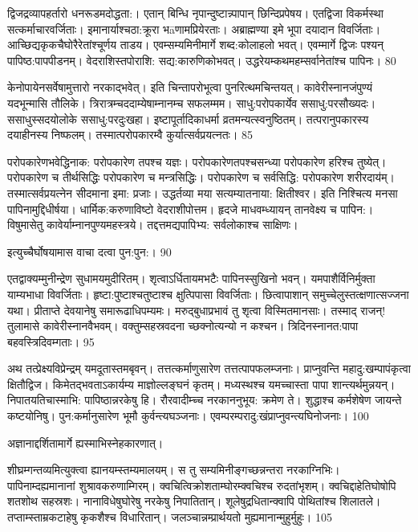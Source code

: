 द्विजद्रव्यापहर्तारो धनरूडमदोद्धता:।
एतान् बिन्धि नृपान्दुष्टान्न्पापान् छिन्दिप्रपेषय।
एतद्विजा विकर्मस्था सत्कर्माचारवर्जिताः।
इमानार्याश्चठा:क्रूरा भāणामप्रियेरताः।
अब्राह्मण्या इमे भूपा दयादान विवर्जिताः।
आच्छिद्यकृकचैघोरैरेतांश्चूर्णय ताडय।
एवम्सम्यमिनीमार्गे शब्द:कोलाहलो भवत्।
एवम्मार्गे द्विजः पश्यन् पापिष्ठ:पापपीडनम्।
वेदराशिस्तपोराशि: सद्य:कारुणिकोभवत्।
उद्धरेयम्कथमहम्सर्वानेतांश्च पापिनः।
80



केनोपायेनसर्वेषामुत्तारो नरकाद्भवेत्।
इति चिन्तापरोभूत्वा पुनरित्थमचिन्तयत्।
कावेरीस्नानजंपुण्यं यदभून्मासि तौलिके।
त्रिरात्रम्चददाम्येषाम्नानम्च सफलम्मम।
साधु:परोपकार्येव ससाधु:परसौख्यदः।
ससाधुस्सदयोलोके ससाधु:परदुःखहा।
इष्टापूर्तादिकाधर्मा व्रतमन्यत्स्वनुष्ठितम्।
तत्परानुपकारस्य दयाहीनस्य निष्फलम्।
तस्मात्परोपकारम्वै कुर्यात्सर्वप्रयत्नतः।
85

परोपकारेणभवेद्धिनाक: परोपकारेण तपश्च यज्ञः।
परोपकारेणतपश्चसन्ध्या परोपकारेण हरिश्च तुष्येत्।
परोपकारेण च तीर्थसिद्धिः
परोपकारेण च मन्त्रसिद्धिः।
परोपकारेण च सर्वसिद्धि:
परोपकारेण शरीरदाय॑म्।
तस्मात्सर्वप्रयत्नेन सीदमाना इमा: प्रजाः।
उद्धर्तव्या मया सत्यम्यातनाया: क्षितीश्वर।
इति निश्चित्य मनसा पापिनामुद्दिधीर्षया।
धार्मिक:करुणाविष्टो वेदराशीपोत्तम।
हृदजे माधवम्ध्यायन् तानवेक्ष्य च पापिन:।
विषुमासेतु कावेर्याम्नानपुण्यमहस्त्रये।
तद्दत्तमद्यपापिभ्य: सर्वलोकाश्च साक्षिणः।


इत्युच्चैर्घोषयामास वाचा दत्वा पुन:पुन:।
90

एतद्वाक्यम्मुनीन्द्रेण सुधामयमुदीरितम्।
शृत्वाऽर्धितायमभटैः पापिनस्सुखिनो भवन्।
यमपाशैर्विनिर्मुक्ता याम्यभाधा विवर्जिताः।
हृष्टा:पुष्टाश्चतुष्टाश्च क्षुत्पिपासा विवर्जिताः।
छित्वापाशान् समुच्चेलुस्तत्क्षणात्सज्जना यथा।
प्रीताप्ते देवयानेषु समारूढाधिपम्यमः।
मरुद्बुधाप्रभावं तु शृत्वा विस्मितमानसाः।
तस्माद् राजन्! तुलामासे कावेरीस्नानवैभवम्।
वक्तुम्सहस्रवदना च्छक्नोत्यन्यो न कश्चन।
त्रिदिनस्नानत:पापा बहवस्त्रिदिवम्गताः।
95

अथ तत्प्रेक्ष्यविप्रेन्द्रम् यमदूतास्तमबृवन्।
तत्तत्कर्माणुसारेण तत्तत्पापफलम्जनाः।
प्राप्नुवन्ति महादु:खम्पापंकृत्वा क्षितौद्विज।
किमेतद्भवताऽकार्यम्य माज्ञोल्लङ्घनं कृतम्।
मध्यस्थश्च यमच्चास्ता पापा शान्त्यर्थमुन्नयन्।
निपातयतिचास्माभि: पापिष्ठान्नरकेषु हि।
रौरवादीम्च्च नरकाननुभूय: क्रमेण ते।
शुद्धाश्च कर्मशेषेण जायन्ते कष्टयोनिषु।
पुन:कर्मानुसारेण भूमौ कुर्वन्त्यघञ्जनाः।
एवम्परम्परादु:खंप्राप्नुवन्त्यघिनोजनाः।
100

अज्ञानाद्दर्शितामार्गे ह्यस्माभिस्नेहकारणात्।


शीघ्रम्गन्तव्यमित्युक्त्वा ह्यानयम्स्तम्यमालयम्।
स तु सम्यमिनीङ्गच्छन्नन्तरा नरकाग्निभिः।
पापिनाम्दह्यमानानां शुश्रावकरुणाम्गिरम्।
क्वचित्विक्रोशताम्घोरम्क्वचिश्च रुदतांभृशम्।
क्वचिद्दाहेतिघोषोपि शतशोथ सहस्रशः।
नानाविधेषुघोरेषु नरकेषु निपातितान्।
शूलेषुद्रधितान्क्वापि पोथितांश्च शिलातले।
तप्ताम्स्ताम्रकटाहेषु कृकशैश्च विधारितान्।
जलञ्चान्नम्प्रार्थयतो मुह्यमानान्मुहुर्मुहुः।
105

